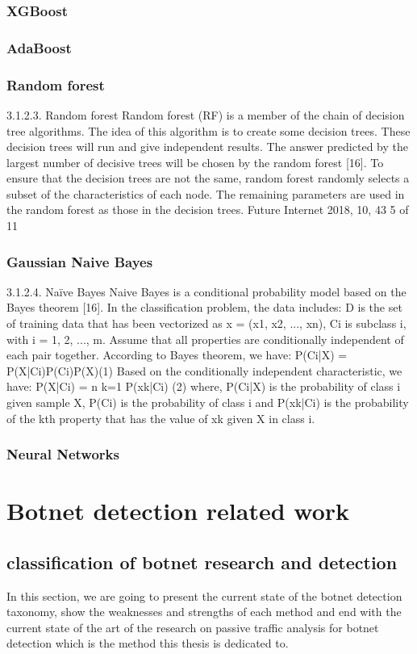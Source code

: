 \subsubsection{XGBoost}
\subsubsection{AdaBoost}
\subsubsection{Random forest}
3.1.2.3. Random forest
Random forest (RF) is a member of the chain of decision tree algorithms. The idea of this algorithm
is to create some decision trees. These decision trees will run and give independent results. The answer
predicted by the largest number of decisive trees will be chosen by the random forest [16]. To ensure
that the decision trees are not the same, random forest randomly selects a subset of the characteristics
of each node. The remaining parameters are used in the random forest as those in the decision trees.
Future Internet 2018, 10, 43 5 of 11

\subsubsection{Gaussian Naive Bayes}
3.1.2.4. Naïve Bayes
Naive Bayes is a conditional probability model based on the Bayes theorem [16]. In the
classification problem, the data includes: D is the set of training data that has been vectorized as
x = (x1, x2, ..., xn), Ci
is subclass i, with i = {1, 2, ..., m}. Assume that all properties are conditionally
independent of each pair together. According to Bayes theorem, we have:
P(Ci|X) = P(X|Ci)P(Ci)P(X)(1)
Based on the conditionally independent characteristic, we have:
P(X|Ci) = n k=1 P(xk|Ci) (2)
where, P(Ci|X) is the probability of class i given sample X, P(Ci) is the probability of class i and P(xk|Ci)
is the probability of the kth property that has the value of xk given X in class i.
\subsubsection{Neural Networks}

\section{Botnet detection related work}
\subsection{classification of botnet research and detection}
In this section, we are going to present the current state of the botnet detection taxonomy, show the weaknesses and strengths of each method and end with the current state of the art of the research on passive traffic analysis for botnet detection which is the method this thesis is dedicated to.\\

